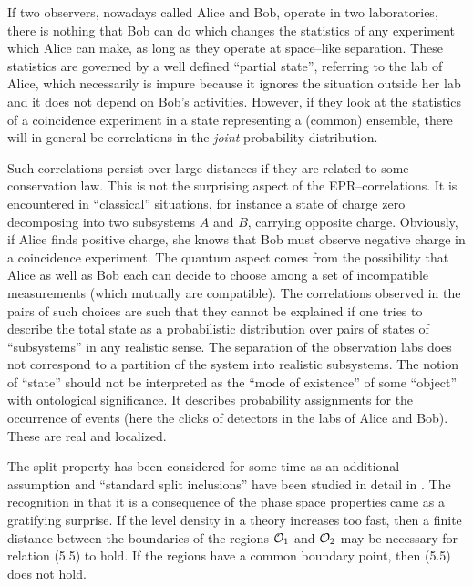 If two observers, nowadays called Alice and Bob, operate in two 
laboratories, there is nothing that Bob can do which 
changes the statistics of any experiment which Alice can make, as long
as they operate at space--like separation. These statistics are 
governed by a well defined 
``partial state'', referring to the lab of Alice, 
which necessarily is impure because it ignores the situation outside
her lab and it does not depend on Bob's activities. 
However, if they look at the statistics of a coincidence
experiment in a state representing a (common) ensemble, there will
in general be correlations in the {\em joint} probability distribution. 

Such correlations persist over large distances if they are 
related to some conservation law. This is not the surprising aspect of 
the EPR--correlations. It is encountered in ``classical''
situations, for instance a state of charge zero decomposing into 
two subsystems $A$ and $B$, carrying opposite charge. Obviously,
if Alice finds positive charge, she knows that Bob must observe
negative charge in a coincidence experiment. The quantum aspect
comes from the possibility that Alice as well as Bob each can decide
to choose among a set of incompatible measurements (which mutually
are compatible). The correlations observed in the pairs of  
such choices are such that they cannot be explained if one tries
to describe the total state as a probabilistic distribution over
pairs of states of ``subsystems'' in any realistic sense. The 
separation of the observation labs does not correspond to a partition
of the system into realistic subsystems. The notion of ``state''
should not be interpreted as the ``mode of existence'' of some
``object'' with ontological significance. It describes 
probability assignments for the occurrence of events (here the clicks 
of detectors in the labs of Alice and Bob). These are real and 
localized.  

The split property has been considered for some time as an additional
assumption and ``standard split inclusions'' have been studied in 
detail in \cite{DoLo}. The recognition in \cite{BuWi,BuDaFr} that it is
a consequence of the phase space properties came as 
a gratifying surprise. If the level density in a theory increases 
too fast, then a finite distance between the boundaries  of the 
regions ${\cal O}_1$ and ${\cal O}_2$ may be necessary for 
relation (5.5) to hold. If the regions have a common boundary 
point, then (5.5)  does not hold.  
